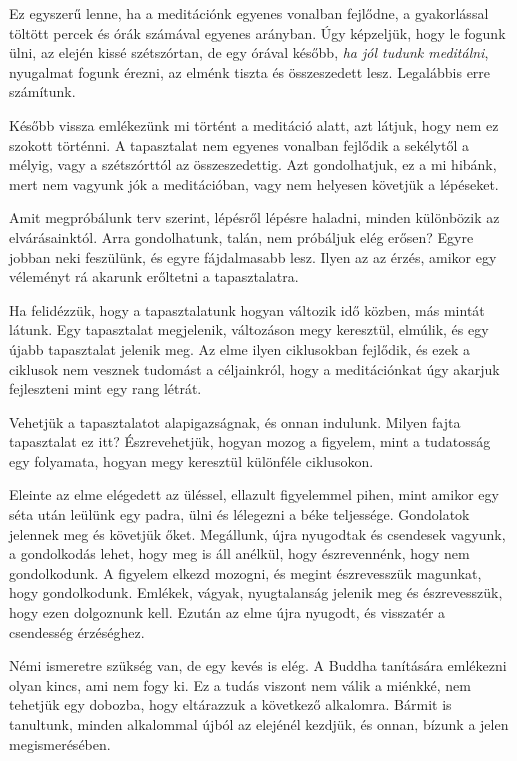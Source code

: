 Ez egyszerű lenne, ha a meditációnk egyenes vonalban fejlődne, a
gyakorlással töltött percek és órák számával egyenes arányban. Úgy
képzeljük, hogy le fogunk ülni, az elején kissé szétszórtan, de egy
órával később, \emph{ha jól tudunk meditálni}, nyugalmat fogunk érezni,
az elménk tiszta és összeszedett lesz. Legalábbis erre számítunk.

Később vissza emlékezünk mi történt a meditáció alatt, azt látjuk, hogy
nem ez szokott történni. A tapasztalat nem egyenes vonalban fejlődik a
sekélytől a mélyig, vagy a szétszórttól az összeszedettig. Azt
gondolhatjuk, ez a mi hibánk, mert nem vagyunk jók a meditációban, vagy
nem helyesen követjük a lépéseket.

Amit megpróbálunk terv szerint, lépésről lépésre haladni, minden
különbözik az elvárásainktól. Arra gondolhatunk, talán, nem próbáljuk
elég erősen? Egyre jobban neki feszülünk, és egyre fájdalmasabb lesz.
Ilyen az az érzés, amikor egy véleményt rá akarunk erőltetni a
tapasztalatra.

Ha felidézzük, hogy a tapasztalatunk hogyan változik idő közben, más
mintát látunk. Egy tapasztalat megjelenik, változáson megy keresztül,
elmúlik, és egy újabb tapasztalat jelenik meg. Az elme ilyen ciklusokban
fejlődik, és ezek a ciklusok nem vesznek tudomást a céljainkról, hogy a
meditációnkat úgy akarjuk fejleszteni mint egy rang létrát.

Vehetjük a tapasztalatot alapigazságnak, és onnan indulunk. Milyen fajta
tapasztalat ez itt? Észrevehetjük, hogyan mozog a figyelem, mint a
tudatosság egy folyamata, hogyan megy keresztül különféle ciklusokon.

Eleinte az elme elégedett az üléssel, ellazult figyelemmel pihen, mint
amikor egy séta után leülünk egy padra, ülni és lélegezni a béke
teljessége. Gondolatok jelennek meg és követjük őket. Megállunk, újra
nyugodtak és csendesek vagyunk, a gondolkodás lehet, hogy meg is áll
anélkül, hogy észrevennénk, hogy nem gondolkodunk. A figyelem elkezd
mozogni, és megint észrevesszük magunkat, hogy gondolkodunk. Emlékek,
vágyak, nyugtalanság jelenik meg és észrevesszük, hogy ezen dolgoznunk
kell. Ezután az elme újra nyugodt, és visszatér a csendesség érzéséghez.

Némi ismeretre szükség van, de egy kevés is elég. A Buddha tanítására
emlékezni olyan kincs, ami nem fogy ki. Ez a tudás viszont nem válik a
miénkké, nem tehetjük egy dobozba, hogy eltárazzuk a következő
alkalomra. Bármit is tanultunk, minden alkalommal újból az elejénél
kezdjük, és onnan, bízunk a jelen megismerésében.

